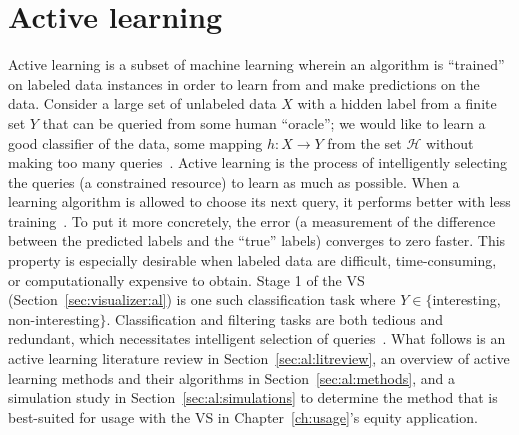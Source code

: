 \chapter{Active learning \label{ch:al}}

Active learning is a subset of machine learning wherein an algorithm is 
``trained'' on labeled data instances in order to learn from and make 
predictions on the data.  Consider a large set of unlabeled data $X$ with a 
hidden label from a finite set $Y$ that can be queried from some human 
``oracle''; we would like to learn a good classifier of the data, some mapping 
$h: X \rightarrow Y$ from the set $\mathcal{H}$ without making too many 
queries~\cite{dasgupta2011}. Active learning is the process of intelligently 
selecting the queries (a constrained resource) to learn as much as possible. 
When a learning algorithm is allowed to choose its next query, it performs 
better with less training~\cite{settles2010}. To put it more concretely, the 
error (a measurement of the difference between the predicted labels and the 
``true'' labels) converges to zero faster. This property is especially 
desirable when labeled data are difficult, time-consuming, or computationally 
expensive to obtain. Stage 1 of the VS (Section~\ref{sec:visualizer:al}) is 
one such classification task where $Y\in\{$interesting, non-interesting$\}$. 
Classification and filtering tasks are both tedious and redundant, which 
necessitates intelligent selection of queries~\cite{settles2010}. What follows 
is an active learning literature review in Section~\ref{sec:al:litreview}, an 
overview of active learning methods and their algorithms in 
Section~\ref{sec:al:methods}, and a simulation study in 
Section~\ref{sec:al:simulations} to determine the method that is best-suited 
for usage with the VS in Chapter~\ref{ch:usage}'s equity application.





%
%
